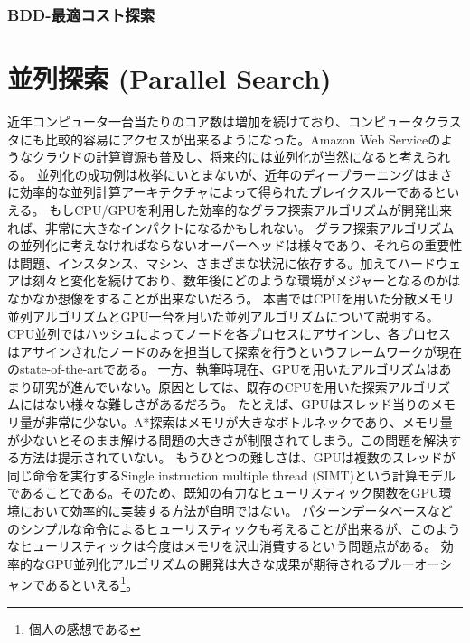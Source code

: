 \documentclass[b5paper]{report}
\begin{document}
\subsubsection{BDD-最適コスト探索}



\section{並列探索 (Parallel Search)}
\label{sec:parallel-search}

近年コンピュータ一台当たりのコア数は増加を続けており、コンピュータクラスタにも比較的容易にアクセスが出来るようになった。Amazon Web Serviceのようなクラウドの計算資源も普及し、将来的には並列化が当然になると考えられる。
並列化の成功例は枚挙にいとまないが、近年のディープラーニングはまさに効率的な並列計算アーキテクチャによって得られたブレイクスルーであるといえる。
もしCPU/GPUを利用した効率的なグラフ探索アルゴリズムが開発出来れば、非常に大きなインパクトになるかもしれない。
グラフ探索アルゴリズムの並列化に考えなければならないオーバーヘッドは様々であり、それらの重要性は問題、インスタンス、マシン、さまざまな状況に依存する。加えてハードウェアは刻々と変化を続けており、数年後にどのような環境がメジャーとなるのかはなかなか想像をすることが出来ないだろう。
本書ではCPUを用いた分散メモリ並列アルゴリズムとGPU一台を用いた並列アルゴリズムについて説明する。
CPU並列ではハッシュによってノードを各プロセスにアサインし、各プロセスはアサインされたノードのみを担当して探索を行うというフレームワークが現在のstate-of-the-artである。
一方、執筆時現在、GPUを用いたアルゴリズムはあまり研究が進んでいない。原因としては、既存のCPUを用いた探索アルゴリズムにはない様々な難しさがあるだろう。
たとえば、GPUはスレッド当りのメモリ量が非常に少ない。A*探索はメモリが大きなボトルネックであり、メモリ量が少ないとそのまま解ける問題の大きさが制限されてしまう。この問題を解決する方法は提示されていない。
もうひとつの難しさは、GPUは複数のスレッドが同じ命令を実行するSingle instruction multiple thread (SIMT)という計算モデルであることである。そのため、既知の有力なヒューリスティック関数をGPU環境において効率的に実装する方法が自明ではない。
パターンデータベースなどのシンプルな命令によるヒューリスティックも考えることが出来るが、このようなヒューリスティックは今度はメモリを沢山消費するという問題点がある。
効率的なGPU並列化アルゴリズムの開発は大きな成果が期待されるブルーオーシャンであるといえる\footnote{個人の感想である}。
\end{document}
